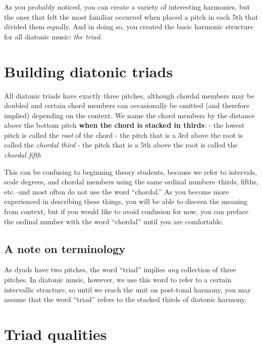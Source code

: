 \documentclass{book}
\begin{document}
As you probably noticed, you can create a variety of interesting harmonies,
but the ones that felt the most familiar occurred when placed a pitch in each
5th that divided them equally. And in doing so, you created the basic harmonic
structure for all diatonic music: \emph{the triad}.

\hypertarget{building-diatonic-triads}{%
\section{Building diatonic triads}\label{building-diatonic-triads}}

All diatonic triads have exactly three pitches, although chordal members may
be doubled and certain chord members can occasionally be omitted (and
therefore implied) depending on the context. We name the chord members by the
distance above the bottom pitch \textbf{when the chord is stacked in thirds}:
- the lowest pitch is called the \emph{root} of the chord - the pitch that is
a 3rd above the root is called the \emph{chordal third} - the pitch that is a
5th above the root is called the \emph{chordal fifth}

This can be confusing to beginning theory students, because we refer to
intervals, scale degrees, and chordal members using the same ordinal
numbers--thirds, fifths, etc.--and most often do not use the word ``chordal.''
As you become more experienced in describing these things, you will be able to
discern the meaning from context, but if you would like to avoid confusion for
now, you can preface the ordinal number with the word ``chordal'' until you
are comfortable.

\hypertarget{a-note-on-terminology}{%
\subsection{A note on terminology}\label{a-note-on-terminology}}

As dyads have two pitches, the word ``triad'' implies \emph{any} collection of
three pitches. In diatonic music, however, we use this word to refer to a
certain intervallic structure, so until we reach the unit on post-tonal
harmony, you may assume that the word ``triad'' refers to the stacked thirds
of diatonic harmony.

\hypertarget{triad-qualities}{%
\section{Triad qualities}\label{triad-qualities}}
\end{document}

